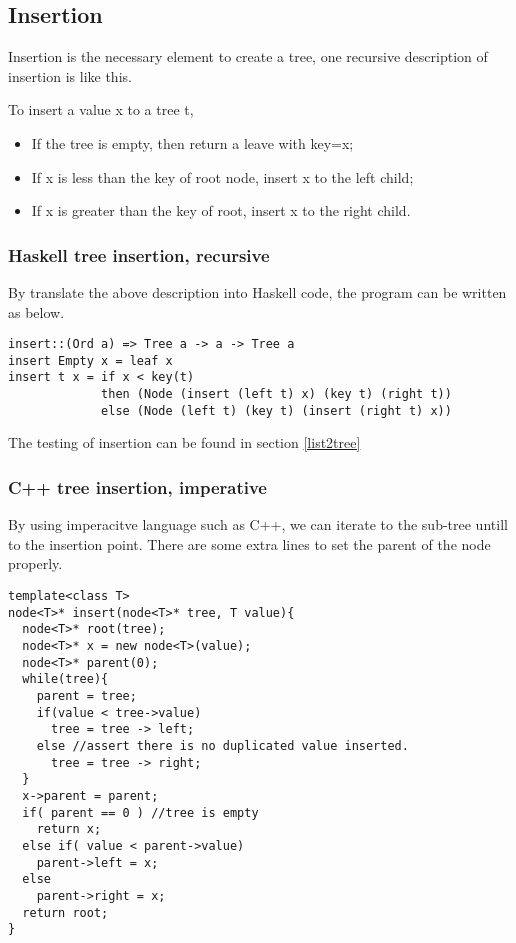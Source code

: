 \documentclass{article}
\begin{document}
\subsection{Insertion}
Insertion is the necessary element to create a tree, one recursive description
of insertion is like this.

To insert a value x to a tree t,
\begin{itemize}
\item If the tree is empty, then return a leave with key=x;
\item If x is less than the key of root node, insert x to the left child;
\item If x is greater than the key of root, insert x to the right child.
\end{itemize}

\subsubsection*{Haskell tree insertion, recursive}
By translate the above description into Haskell code, the program can be written
as below.

\begin{lstlisting}
insert::(Ord a) => Tree a -> a -> Tree a
insert Empty x = leaf x
insert t x = if x < key(t) 
             then (Node (insert (left t) x) (key t) (right t))
             else (Node (left t) (key t) (insert (right t) x))
\end{lstlisting}

The testing of insertion can be found in section \ref{list2tree}

\subsubsection*{C++ tree insertion, imperative}

By using imperacitve language such as C++, we can iterate to the sub-tree untill
to the insertion point. There are some extra lines to set the parent of the node
properly.

\lstset{language=C++}
\begin{lstlisting}
template<class T>
node<T>* insert(node<T>* tree, T value){
  node<T>* root(tree);
  node<T>* x = new node<T>(value);
  node<T>* parent(0);
  while(tree){
    parent = tree;
    if(value < tree->value)
      tree = tree -> left;
    else //assert there is no duplicated value inserted.
      tree = tree -> right;
  }
  x->parent = parent;
  if( parent == 0 ) //tree is empty
    return x;
  else if( value < parent->value)
    parent->left = x;
  else
    parent->right = x;
  return root;
}
\end{lstlisting}
\end{document}

